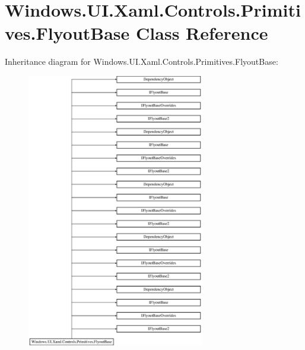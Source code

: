 \hypertarget{class_windows_1_1_u_i_1_1_xaml_1_1_controls_1_1_primitives_1_1_flyout_base}{}\section{Windows.\+U\+I.\+Xaml.\+Controls.\+Primitives.\+Flyout\+Base Class Reference}
\label{class_windows_1_1_u_i_1_1_xaml_1_1_controls_1_1_primitives_1_1_flyout_base}
Inheritance diagram for Windows.\+U\+I.\+Xaml.\+Controls.\+Primitives.\+Flyout\+Base\+:\begin{figure}[H]
\begin{center}
\leavevmode
\includegraphics[height=12.000000cm]{class_windows_1_1_u_i_1_1_xaml_1_1_controls_1_1_primitives_1_1_flyout_base}
\end{center}
\end{figure}
